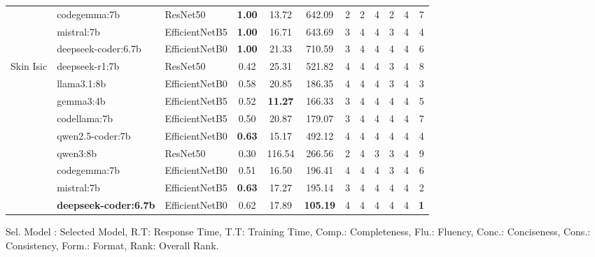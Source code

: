 \documentclass{article}
\begin{document}
\begin{small}
\begin{tabularx}{\textwidth}{l l l c c c c c c c c c}
 & codegemma:7b & ResNet50 & \textbf{1.00} & 13.72 & 642.09 & 2 & 2 & 4 & 2 & 4 & 7 \\
 & mistral:7b & EfficientNetB5 & \textbf{1.00} & 16.71 & 643.69 & 3 & 4 & 4 & 3 & 4 & 4 \\
 & deepseek-coder:6.7b & EfficientNetB0 & \textbf{1.00} & 21.33 & 710.59 & 3 & 4 & 4 & 4 & 4 & 6 \\
\midrule
\multirow{9}{*}{Skin Isic}
 & deepseek-r1:7b & ResNet50 & 0.42 & 25.31 & 521.82 & 4 & 4 & 4 & 3 & 4 & 8 \\
 & llama3.1:8b & EfficientNetB0 & 0.58 & 20.85 & 186.35 & 4 & 4 & 4 & 3 & 4 & 3 \\
 & gemma3:4b & EfficientNetB5 & 0.52 & \textbf{11.27} & 166.33 & 3 & 4 & 4 & 4 & 4 & 5 \\
 & codellama:7b & EfficientNetB5 & 0.50 & 20.87 & 179.07 & 3 & 4 & 4 & 4 & 4 & 7 \\
 & qwen2.5-coder:7b & EfficientNetB0 & \textbf{0.63} & 15.17 & 492.12 & 4 & 4 & 4 & 4 & 4 & 4 \\
 & qwen3:8b & ResNet50 & 0.30 & 116.54 & 266.56 & 2 & 4 & 3 & 3 & 4 & 9 \\
 & codegemma:7b & EfficientNetB0 & 0.51 & 16.50 & 196.41 & 4 & 4 & 4 & 3 & 4 & 6 \\
 & mistral:7b & EfficientNetB5 & \textbf{0.63} & 17.27 & 195.14 & 3 & 4 & 4 & 4 & 4 & 2 \\
 & \textbf{deepseek-coder:6.7b} & EfficientNetB0 & 0.62 & 17.89 & \textbf{105.19} & 4 & 4 & 4 & 4 & 4 & \textbf{1} \\

\bottomrule
\end{tabularx}

\footnotesize\raggedright
Sel. Model : Selected Model, R.T: Response Time, T.T: Training Time, Comp.: Completeness, Flu.: Fluency, Conc.: Conciseness, Cons.: Consistency, Form.: Format, Rank: Overall Rank.
\end{small}
\end{document}
